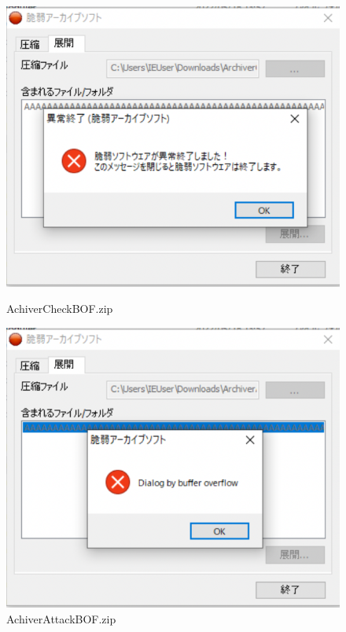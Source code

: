 \documentclass[dvipdfmx,autodetect-engine,titlepage]{jsarticle}
\begin{document}
\begin{figure}[h]
  \centering
  \begin{minipage}[b]{0.45\linewidth}
  \begin{center}
    \includegraphics[keepaspectratio,scale=0.6]{pic2.png}
    \end{center}
    \caption{AchiverCheckBOF.zip}
  \end{minipage}
  \begin{minipage}[b]{0.45\linewidth}
  \begin{center}
    \includegraphics[keepaspectratio,scale=0.6]{pic3.png}
    \end{center}
    \caption{AchiverAttackBOF.zip}
  \end{minipage}
\end{figure}
\end{document}
